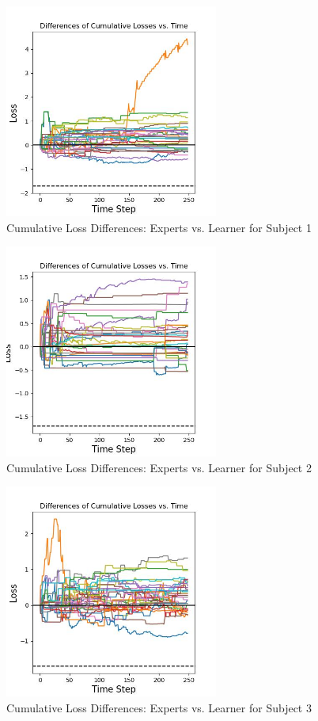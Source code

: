 \begin{figure}[hb]
    \centering
    \includegraphics[width=0.625\textwidth]{images/AH_differences.jpg}
    \caption{Cumulative Loss Differences: Experts vs. Learner for Subject 1}
\end{figure}
\begin{figure}[ht]
    \centering
    \includegraphics[width=0.625\textwidth]{images/EE_differences.jpg}
    \caption{Cumulative Loss Differences: Experts vs. Learner for Subject 2}
\end{figure}
\begin{figure}[h!]
    \centering
    \includegraphics[width=0.625\textwidth]{images/HA_differences.jpg}
    \caption{Cumulative Loss Differences: Experts vs. Learner for Subject 3}
\end{figure}

